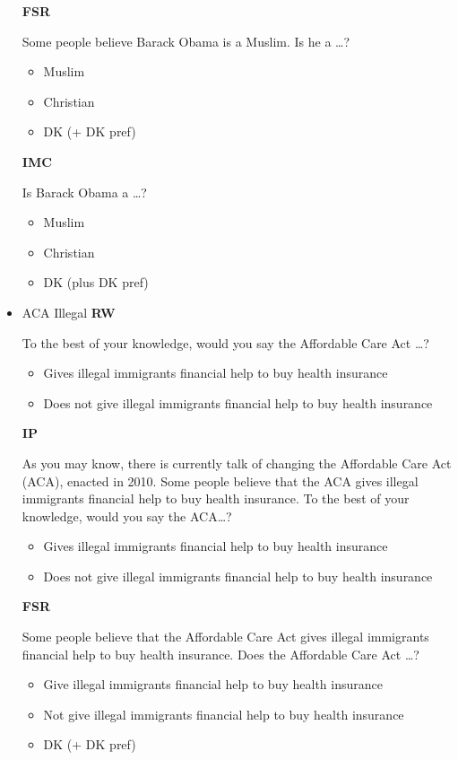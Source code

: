 \begin{itemize}
\textbf{FSR}\newline

Some people believe Barack Obama is a Muslim. Is he a \ldots?
\begin{itemize}
	\item Muslim
	\item Christian
	\item DK (+ DK pref)
\end{itemize}

\textbf{IMC}\newline

Is Barack Obama a \ldots?
\begin{itemize}
	\item Muslim
	\item Christian
	\item DK (plus DK pref)
\end{itemize}

\item ACA Illegal\newline
\textbf{RW}\newline

To the best of your knowledge, would you say the Affordable Care Act \ldots?
\begin{itemize}
	\item Gives illegal immigrants financial help to buy health insurance
	\item Does not give illegal immigrants financial help to buy health insurance
\end{itemize}

\textbf{IP}\newline

As you may know, there is currently talk of changing the Affordable Care Act
(ACA), enacted in 2010. Some people believe that the ACA gives illegal immigrants
financial help to buy health insurance. To the best of your knowledge, would you say
the ACA\ldots?
\begin{itemize}
	\item Gives illegal immigrants financial help to buy health insurance
	\item Does not give illegal immigrants financial help to buy health insurance
\end{itemize}

\textbf{FSR}\newline

Some people believe that the Affordable Care Act gives illegal immigrants financial help
to buy health insurance. Does the Affordable Care Act \ldots?
\begin{itemize}
	\item Give illegal immigrants financial help to buy health insurance
	\item Not give illegal immigrants financial help to buy health insurance
	\item DK (+ DK pref)
\end{itemize}


\end{itemize}
